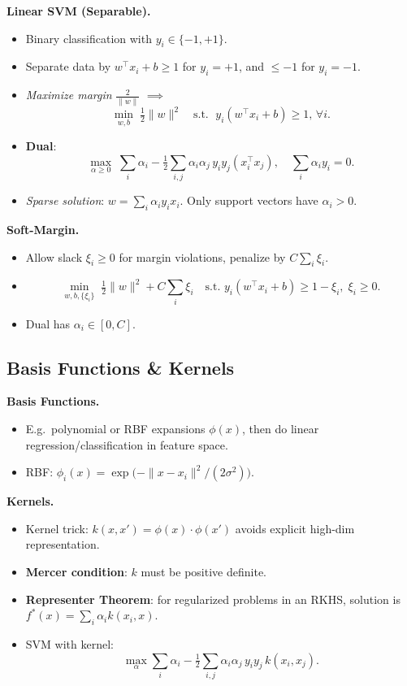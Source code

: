 \documentclass[10pt]{article}
\begin{document}
\begin{multicols}{2}
\textbf{Linear SVM (Separable).}
\begin{itemize}
\item Binary classification with $y_i\in\{-1,+1\}$.
\item Separate data by $w^\top x_i + b \ge1$ for $y_i=+1$, and $\le-1$ for $y_i=-1$.
\item \emph{Maximize margin} $\frac{2}{\|w\|}$ $\implies$
\[
\min_{w,b}\;\tfrac12 \|w\|^2
\quad
\text{s.t. } \;y_i(w^\top x_i + b)\ge1, \,\forall i.
\]
\item \textbf{Dual}:
\[
\max_{\alpha\ge0}\;\sum_{i}\alpha_i-\tfrac12\sum_{i,j}\alpha_i\alpha_j\,y_i y_j (x_i^\top x_j),
\quad
\sum_i \alpha_i y_i=0.
\]
\item \emph{Sparse solution}: $w=\sum_i\alpha_i y_i x_i$. Only support vectors have $\alpha_i>0$.
\end{itemize}

\textbf{Soft-Margin.}
\begin{itemize}
\item Allow slack $\xi_i\ge0$ for margin violations, penalize by $C\sum_i \xi_i$.
\item \[
\min_{w,b,\{\xi_i\}}\;\tfrac12 \|w\|^2 + C\sum_{i}\xi_i
\quad
\text{s.t. } y_i(w^\top x_i + b)\ge1-\xi_i,\;\xi_i\ge0.
\]
\item Dual has $\alpha_i\in[0,C]$.
\end{itemize}

\subsection*{Basis Functions \& Kernels}

\textbf{Basis Functions.}
\begin{itemize}
\item E.g.\ polynomial or RBF expansions $\phi(x)$, then do linear regression/classification in feature space.
\item RBF: $\phi_i(x)=\exp\bigl(-\|x-x_i\|^2/(2\sigma^2)\bigr)$.
\end{itemize}

\textbf{Kernels.}
\begin{itemize}
\item Kernel trick: $k(x,x')=\phi(x)\cdot\phi(x')$ avoids explicit high-dim representation.
\item \textbf{Mercer condition}: $k$ must be positive definite.
\item \textbf{Representer Theorem}: for regularized problems in an RKHS, solution is $f^*(x)=\sum_i \alpha_i k(x_i,x)$.
\item SVM with kernel:
\[
\max_\alpha \sum_i \alpha_i -\tfrac12 \sum_{i,j}\alpha_i\alpha_j\,y_i y_j\,k(x_i,x_j).
\]
\end{itemize}


\end{multicols}
\end{document}
